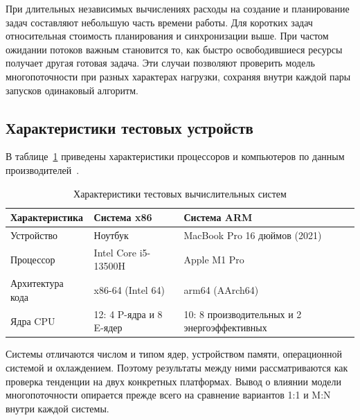 При длительных независимых вычислениях расходы на создание и планирование задач составляют
  небольшую часть времени работы. Для коротких задач относительная стоимость планирования и
  синхронизации выше. При частом ожидании потоков важным становится то, как быстро освободившиеся
  ресурсы получает другая готовая задача. Эти случаи позволяют проверить модель многопоточности при разных
  характерах нагрузки, сохраняя внутри каждой пары запусков одинаковый алгоритм.

\subsection{Характеристики тестовых устройств}
\label{subsec:test-systems}

В таблице~\ref{tab:test-systems} приведены характеристики процессоров и компьютеров по данным
  производителей~\cite{intel_i513500h,apple_m1pro_specs}.

\begin{table}[htbp]
  \centering
  \caption{Характеристики тестовых вычислительных систем}
  \label{tab:test-systems}
  \begin{tabularx}{\textwidth}{|p{3.4cm}|X|X|}
    \hline
    Характеристика & Система x86 & Система ARM \\
    \hline
    Устройство & Ноутбук & MacBook Pro 16 дюймов (2021) \\
    \hline
    Процессор & Intel Core i5-13500H & Apple M1 Pro \\
    \hline
    Архитектура кода & x86-64 (Intel 64) & arm64 (AArch64) \\
    \hline
    Ядра CPU & 12: 4 P-ядра и 8 E-ядер & 10: 8 производительных и 2 энергоэффективных \\
    \hline
  \end{tabularx}
\end{table}


Системы отличаются числом и типом ядер, устройством памяти, операционной системой и охлаждением.
  Поэтому результаты между ними рассматриваются как проверка тенденции на двух конкретных
  платформах. Вывод о влиянии модели многопоточности опирается прежде всего на сравнение вариантов
  1:1 и M:N внутри каждой системы.
